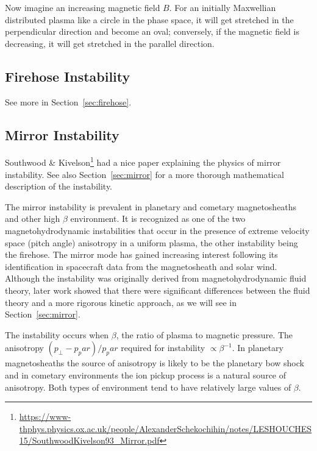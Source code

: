 \documentclass[
  notoc %
]{tufte-book}
\DeclareRobustCommand{\href}[2]{#2\footnote{\url{#1}}}
\begin{document}
Now imagine an increasing magnetic field \(B\). For an initially
Maxwellian distributed plasma like a circle in the phase space, it will
get stretched in the perpendicular direction and become an oval;
conversely, if the magnetic field is decreasing, it will get stretched
in the parallel direction.

\hypertarget{firehose-instability}{%
\subsection{Firehose Instability}\label{firehose-instability}}

See more in Section~\ref{sec:firehose}.

\hypertarget{mirror-instability}{%
\subsection{Mirror Instability}\label{mirror-instability}}

\href{https://www-thphys.physics.ox.ac.uk/people/AlexanderSchekochihin/notes/LESHOUCHES15/SouthwoodKivelson93_Mirror.pdf}{Southwood
\& Kivelson} had a nice paper explaining the physics of mirror
instability. See also Section~\ref{sec:mirror} for a more thorough
mathematical description of the instability.

The mirror instability is prevalent in planetary and cometary
magnetosheaths and other high \(\beta\) environment. It is recognized as
one of the two magnetohydrodynamic instabilities that occur in the
presence of extreme velocity space (pitch angle) anisotropy in a uniform
plasma, the other instability being the firehose. The mirror mode has
gained increasing interest following its identification in spacecraft
data from the magnetosheath and solar wind. Although the instability was
originally derived from magnetohydrodynamic fluid theory, later work
showed that there were significant differences between the fluid theory
and a more rigorous kinetic approach, as we will see in
Section~\ref{sec:mirror}.

The instability occurs when \(\beta\), the ratio of plasma to magnetic
pressure. The anisotropy \((p_\perp - p_par)/p_par\) required for
instability \(\propto \beta^{-1}\). In planetary magnetosheaths the
source of anisotropy is likely to be the planetary bow shock and in
cometary environments the ion pickup process is a natural source of
anisotropy. Both types of environment tend to have relatively large
values of \(\beta\).
\end{document}
